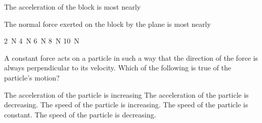 \documentclass{../../../oss-apphys-exam}
\begin{document}
\begin{multicols*}{2}
\begin{questions}
    
    \question The acceleration of the block is most nearly
    \label{plane1}
    
    \question The normal force exerted on the block by the plane is most nearly
    \begin{choices}
      \choice\SI{2}{\newton}
      \choice\SI{4}{\newton}
      \choice\SI{6}{\newton}
      \choice\SI{8}{\newton}
      \choice\SI{10}{\newton}
    \end{choices}
    \label{plane2}
   
    \question A constant force acts on a particle in such a way that the
    direction of the force is always perpendicular to its velocity. Which of the
    following is true of the particle's motion?
    \begin{choices}
      \choice The acceleration of the particle is increasing
      \choice The acceleration of the particle is decreasing.
      \choice The speed of the particle is increasing.
      \choice The speed of the particle is constant.
      \choice The speed of the particle is decreasing.
    \end{choices}
    \vspace{.7in}


\end{questions}
\end{multicols*}
\end{document}
